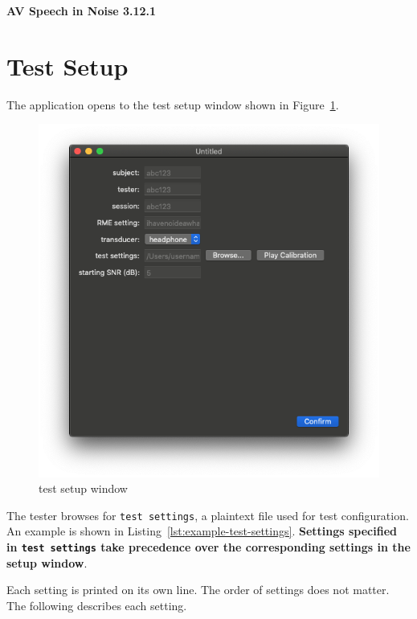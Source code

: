 \documentclass[11pt,pdftex,letterpaper]{article}
\begin{document}
\vspace*{30ex}
\begin{center}
\textbf{AV Speech in Noise 3.12.1}
\end{center}
\pagebreak
\tableofcontents
\pagebreak

\section{Test Setup}
The application opens to the test setup window shown in Figure~\ref{fig:test-setup-window}.
\begin{figure}
	\centering
	\includegraphics[width = 0.9\linewidth]{test-setup-window.png}
	\caption{test setup window}
	\label{fig:test-setup-window}
\end{figure}
The tester browses for \texttt{test settings}, a plaintext file used for test configuration. An example is shown in Listing~\ref{lst:example-test-settings}. \textbf{Settings specified in \texttt{test settings} take precedence over the corresponding settings in the setup window}.

\noindent\begin{minipage}{\textwidth}
	
\end{minipage}
Each setting is printed on its own line. The order of settings does not matter. The following describes each setting.
\end{document}
